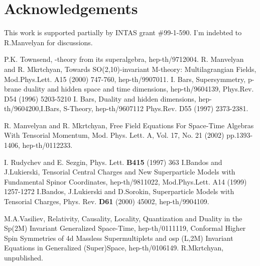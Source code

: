 \documentclass[a4paper,12pt]{article}
\begin{document}
\section{Acknowledgements}

This work is supported partially by INTAS grant \#99-1-590. I'm
indebted to R.Manvelyan for discussions.

\begin{thebibliography}{9}

 P.K. Townsend, \coordHE{}-theory from its superalgebra,
hep-th/9712004.
  R. Manvelyan and R. Mkrtchyan, Towards SO(2,10)-invariant
M-theory: Multilagrangian Fields,  Mod.Phys.Lett. A15 (2000)
747-760, hep-th/9907011.
 I. Bars, Supersymmetry, p-brane duality and hidden space
and time dimensions, hep-th/9604139, Phys.Rev. D54 (1996)
5203-5210 \newline I. Bars, Duality and hidden dimensions,
hep-th/9604200,\newline I.Bars, S-Theory, hep-th/9607112 Phys.Rev.
D55 (1997) 2373-2381.

  R. Manvelyan and R. Mkrtchyan, Free Field Equations For Space-Time Algebras With Tensorial
Momentum, Mod. Phys. Lett. A, Vol. 17, No. 21 (2002) pp.1393-1406,
hep-th/0112233.

 I. Rudychev and E. Sezgin, Phys. Lett. \textbf{B415} (1997) 363
 I.Bandos  and J.Lukierski, Tensorial Central Charges and New Superparticle
Models with Fundamental Spinor Coordinates, hep-th/9811022,
Mod.Phys.Lett. A14 (1999) 1257-1272 \newline I.Bandos, J.Lukierski
and D.Sorokin, Superparticle Models with Tensorial Charges, Phys.
Rev. \textbf{D61} (2000) 45002, hep-th/9904109.


 M.A.Vasiliev, Relativity, Causality, Locality,
Quantization and Duality in the Sp(2M) Invariant Generalized
Space-Time, hep-th/0111119, Conformal Higher Spin Symmetries of 4d
Massless Supermultiplets and osp (L,2M) Invariant Equations in
Generalized (Super)Space, hep-th/0106149.
 R.Mkrtchyan, unpublished.

\end{thebibliography}
\end{document}
